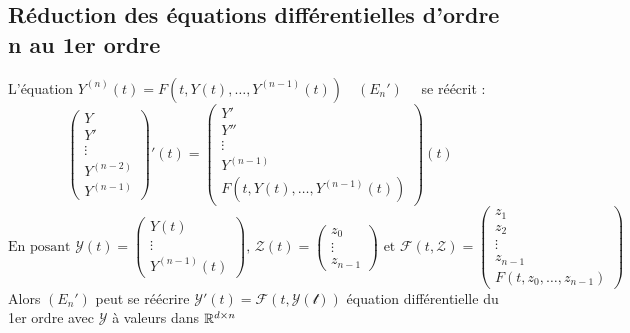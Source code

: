 \documentclass[]{report}
\begin{document}
\subsection*{Réduction des équations différentielles d'ordre n au 1er ordre}

L'équation $Y^{(n)}(t)=F(t,Y(t),\dots,Y^{(n-1)}(t))\quad (E_n')\quad$ se réécrit :
$$\begin{pmatrix}
    Y\\
    Y'\\
    \vdots\\
    Y^{(n-2)}\\
    Y^{(n-1)}
\end{pmatrix}'(t)=
\begin{pmatrix}
Y'\\
Y''\\
\vdots\\
Y^{(n-1)}\\
F(t,Y(t),\dots,Y^{(n-1)}(t))
\end{pmatrix}(t)$$
$$\text{En posant }\mathcal{Y}(t)=\begin{pmatrix}
    Y(t)\\
    \vdots\\
    Y^{(n-1)}(t)
\end{pmatrix}\text{, }\mathcal{Z}(t)=\begin{pmatrix}
    z_0\\
    \vdots\\
    z_{n-1}
\end{pmatrix} \text{ et }\mathcal{F}(t,\mathcal{Z})=\begin{pmatrix}
    z_1\\
    z_2\\
    \vdots\\
    z_{n-1}\\
    F(t,z_0,\dots,z_{n-1})
\end{pmatrix}$$
Alors $(E_n')$ peut se réécrire $\mathcal{Y}'(t)=\mathcal{F}(t,\mathcal{Y(t)})$ équation différentielle du 1er ordre avec $\mathcal{Y}$ à valeurs dans $\mathbb{R}^{d\times n}$
\end{document}
